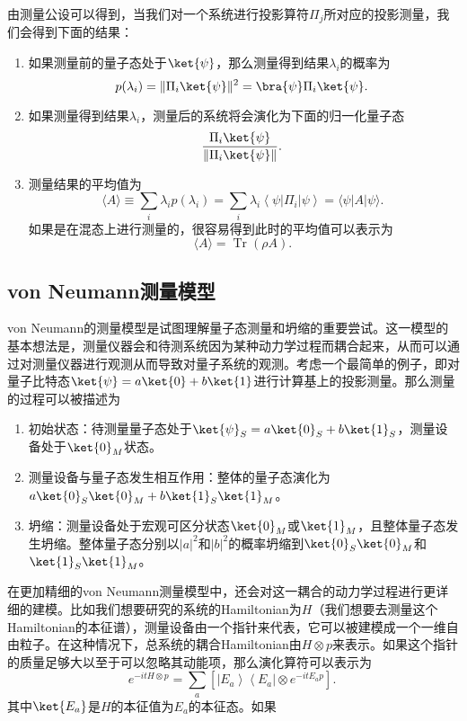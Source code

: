 由测量公设可以得到，当我们对一个系统进行投影算符$\Pi_j$所对应的投影测量，我们会得到下面的结果：
\begin{enumerate}
\item 如果测量前的量子态处于$\ket{\psi}$，那么测量得到结果$\lambda_i$的概率为\begin{equation}
p(\lambda_i)=\Vert \Pi_i\ket{\psi}\Vert^2=\bra{\psi}\Pi_i\ket{\psi}.~
\end{equation}
\item 如果测量得到结果$\lambda_i$，测量后的系统将会演化为下面的归一化量子态
\begin{equation}
\frac{\Pi_i\ket{\psi}}{\Vert\Pi_i\ket{\psi}\Vert}.~
\end{equation}
\item 测量结果的平均值为\begin{equation}
\langle A\rangle \equiv \sum_i \lambda_i p\left(\lambda_i\right)=\sum_i \lambda_i\left\langle\psi\left|\Pi_i\right| \psi\right\rangle=\langle\psi|A| \psi\rangle.~
\end{equation}
如果是在混态上进行测量的，很容易得到此时的平均值可以表示为
\begin{equation}
\langle A\rangle=\operatorname{Tr}(\rho A).~
\end{equation}

\end{enumerate}

\subsection{von Neumann测量模型}

von Neumann的测量模型是试图理解量子态测量和坍缩的重要尝试。这一模型的基本想法是，测量仪器会和待测系统因为某种动力学过程而耦合起来，从而可以通过对测量仪器进行观测从而导致对量子系统的观测。考虑一个最简单的例子，即对量子比特态$\ket{\psi}=a\ket{0}+b\ket{1}$进行计算基上的投影测量。那么测量的过程可以被描述为
\begin{enumerate}
\item 初始状态：待测量量子态处于$\ket{\psi}_S=a\ket{0}_S+b\ket{1}_S$，测量设备处于$\ket{0}_M$状态。
\item 测量设备与量子态发生相互作用：整体的量子态演化为$a\ket{0}_S\ket{0}_M+b\ket{1}_S\ket{1}_M$。
\item 坍缩：测量设备处于宏观可区分状态$\ket{0}_M$或$\ket{1}_M$，且整体量子态发生坍缩。整体量子态分别以$|a|^2$和$|b|^2$的概率坍缩到$\ket{0}_S\ket{0}_M$和$\ket{1}_S\ket{1}_M$。
\end{enumerate}

在更加精细的von Neumann测量模型中，还会对这一耦合的动力学过程进行更详细的建模。比如我们想要研究的系统的Hamiltonian为$H$（我们想要去测量这个Hamiltonian的本征谱），测量设备由一个指针来代表，它可以被建模成一个一维自由粒子。在这种情况下，总系统的耦合Hamiltonian由$H\otimes p$来表示。如果这个指针的质量足够大以至于可以忽略其动能项，那么演化算符可以表示为\begin{equation}
e^{-i t H \otimes p}=\sum_a\left[\left|E_a\right\rangle\left\langle E_a\right| \otimes e^{-i t E_a p}\right].~
\end{equation}
其中$\ket{E_a}$是$H$的本征值为$E_a$的本征态。如果